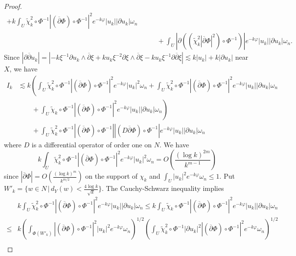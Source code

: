 \documentclass[12pt,oneside]{amsart}
\theoremstyle{plain}
\theoremstyle{definition}
\theoremstyle{remark}
\begin{document}
\begin{proof}
\begin{align*}
 +  k  \int_{U}  \tilde{\chi}^2_{k}\circ \Phi^{-1} |(\overline{\partial} \Phi)\circ \Phi^{-1}|^2 e^{-k \varphi} |u_{k}| |\partial u_{k}| \omega_{n}   \\ 
& \qquad
+ \int_{U} |\partial \left((\tilde{\chi}^2_{k} |\overline{\partial} \Phi|^2) \circ \Phi^{-1} \right)| e^{-k \varphi}|u_{k}| |\partial u_{k}| \omega_{n}.  
\end{align*}
Since $|\partial \overline{\partial} u_k| =|-k \xi^{-1}\partial u_k \wedge \overline{\partial}\xi + k u_k \xi^{-2}\partial \xi \wedge \overline{\partial} \xi -ku_k \xi^{-1} \partial \overline{\partial} \xi| \lesssim k|u_k| + k |\partial u_k|$ near $X$, we have  
\begin{align*}
I_k & \lesssim 
k \left( \int_{U} \tilde{\chi}_{k}^2 \circ \Phi^{-1} |(\overline{\partial} \Phi) \circ \Phi^{-1}|^2 e^{-k \varphi} |{u}_{k}|^2 \omega_{n} 
+  \int_{U} \tilde{\chi}^2_{k}\circ \Phi^{-1} |(\overline{\partial} \Phi)\circ \Phi^{-1}|^2 e^{-k \varphi} |u_{k}| |\partial u_{k}| \omega_{n} \right.\\
& \qquad 
+\left.\int_{U} \tilde{\chi}_{k}\circ \Phi^{-1} |(\overline{\partial} \Phi)\circ \Phi^{-1}|^2 e^{-k \varphi} |u_{k}| |\partial u_{k}| \omega_{n}\right)\\
&\qquad + \int_{U} \tilde{\chi}^2_{k}\circ \Phi^{-1} |(\overline{\partial} \Phi)\circ\Phi^{-1}| |(D \overline{\partial} \Phi) \circ \Phi^{-1}|e^{-k \varphi} |u_{k}| |\partial u_{k}| \omega_{n}
\end{align*}
where $D$ is a differential operator of order one on $N$.  
We have 
\[
k \int_{U} \tilde{\chi}^2_{k}\circ \Phi^{-1} |(\overline{\partial} \Phi)\circ \Phi^{-1}|^2 e^{-k \varphi} |{u}_{k}|^2 \omega_{n}
= O(\frac{(\log k)^{2m}}{k^{m-1}}) 
\]
since $|\overline{\partial} \Phi| = O(\frac{(\log k)^m}{k^{m/2}})$ on the support of $\chi_k$ and $\int_{U}|u_k|^2 e^{-k\varphi} \omega_n \leq 1$.  
Put $W'_{k} = \{w \in N\, |\, d_{Y}(w) < \frac{4\log k}{\sqrt{k}}\}$.  
The Cauchy-Schwarz inequality implies 
\begin{align*}
& k\int_{U} \tilde{\chi}^2_{k}\circ\Phi^{-1} |(\overline{\partial} \Phi)\circ \Phi^{-1}|^2 e^{-k \varphi} |u_{k}| |\partial u_{k}| \omega_{n} 
\leq k \int_{U} \tilde{\chi}_{k}\circ\Phi^{-1} |(\overline{\partial} \Phi)\circ \Phi^{-1}|^2 e^{-k \varphi} |u_{k}| |\partial u_{k}| \omega_{n}  \\
\leq &
k \left( \int_{\Phi(W'_{k})}|(\overline{\partial} \Phi)\circ \Phi^{-1}|^2 |u_{k}|^2 e^{-k \varphi} \omega_{n} \right)^{1/2} \left(\int_{U} \tilde{\chi}^2_{k}\circ \Phi^{-1} |\partial u_{k}|^2 |(\overline{\partial} \Phi)\circ \Phi^{-1}|^2 e^{-k \varphi} \omega_{n} \right)^{1/2} \\

\end{align*}
\end{proof}
\end{document}
